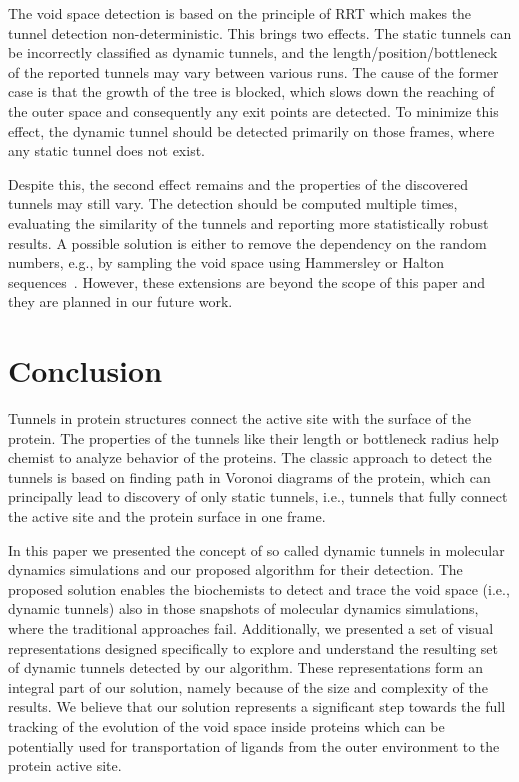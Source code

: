 \documentclass[usletter, 10pt, conference]{svjour3}      %
\begin{document}
The void space detection is based on the principle of RRT which makes the tunnel detection non-deterministic.
This brings two effects. 
The static tunnels can be incorrectly classified as dynamic tunnels, and the length/position/bottleneck of the reported tunnels may vary between various runs.
The cause of the former case is that the growth of the tree is blocked, which slows down the reaching of the outer space and consequently any exit points are detected.
To minimize this effect, the dynamic tunnel should be detected primarily on those frames, where any static tunnel does not exist.

Despite this, the second effect remains and the properties of the discovered tunnels may still vary.
The detection should be computed multiple times, evaluating the similarity of the tunnels and reporting more statistically robust results.
A possible solution is either to remove the dependency on the random numbers, e.g., by sampling the void space using Hammersley or Halton sequences~\cite{Lav06,branickyQuasi,rosell2007general}.
However, these extensions are beyond the scope of this paper and they are planned in our future work.










\section{Conclusion }

Tunnels in protein structures connect the active site with the surface of the protein.
The properties of the tunnels like their length or bottleneck radius help chemist to analyze behavior of the proteins.
The classic approach to detect the tunnels is based on finding path in Voronoi diagrams of the protein, which can principally
lead to discovery of only static tunnels, i.e., tunnels that fully connect the active site and the protein surface in one frame.

In this paper we presented the concept of so called dynamic tunnels in molecular dynamics simulations and our proposed algorithm for their detection.
The proposed solution enables the biochemists to detect and trace the void space (i.e., dynamic tunnels) also in those snapshots of molecular dynamics simulations, where the traditional approaches fail.
Additionally, we presented a set of visual representations designed specifically to explore and understand the resulting set of dynamic tunnels detected by our algorithm. 
These representations form an integral part of our solution, namely because of the size and complexity of the results. 
We believe that our solution represents a significant step towards the full tracking of the evolution of the void space inside proteins which can be potentially used for transportation of ligands from the outer environment to the protein active site.
\end{document}
